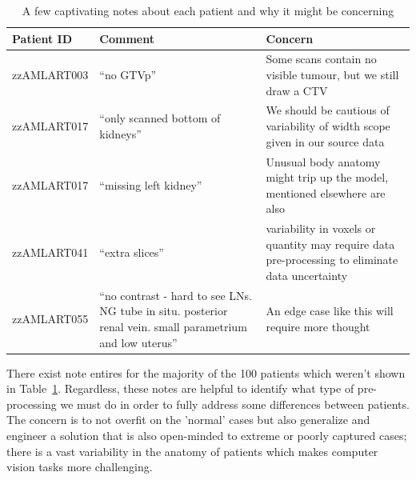 \documentclass[12pt,twoside]{report}
\begin{document}
\begin{table}[ht]
  \centering
  \begin{tabular}{>{\raggedright}p{3cm}p{6cm}p{6cm}}
    \toprule
    \textbf{Patient ID} & \textbf{Comment}                                                                                           & \textbf{Concern}                                                                                \\
    \midrule
    zzAMLART003         & ``no GTVp''                                                                                                & Some scans contain no visible tumour, but we still draw a CTV                                   \\
    \midrule
    zzAMLART017         & ``only scanned bottom of kidneys''                                                                         & We should be cautious of variability of width scope given in our source data                    \\
    \midrule
    zzAMLART017         & ``missing left kidney''                                                                                    & Unusual body anatomy might trip up the model, mentioned elsewhere are also                      \\
    \midrule
    zzAMLART041         & ``extra slices''                                                                                           & variability in voxels or quantity may require data pre-processing to eliminate data uncertainty \\
    \midrule
    zzAMLART055         & ``no contrast - hard to see LNs. NG tube in situ. posterior renal vein. small parametrium and low uterus'' & An edge case like this will require more thought                                                \\
    \bottomrule
  \end{tabular}
  \caption{A few captivating notes about each patient and why it might be concerning}
 \label{tab:notes-summary}
\end{table}

There exist note entires for the majority of the 100 patients which weren't shown in Table~\ref{tab:notes-summary}. Regardless, these notes are helpful to identify what type of pre-processing we must do in order to fully address some differences between patients. The concern is to not overfit on the 'normal' cases but also generalize and engineer a solution that is also open-minded to extreme or poorly captured cases; there is a vast variability in the anatomy of patients which makes computer vision tasks more challenging.
\end{document}
